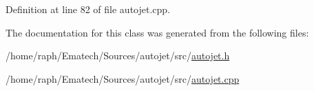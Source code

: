 Definition at line 82 of file autojet.cpp.

The documentation for this class was generated from the following files:\begin{CompactItemize}
\item 
/home/raph/Ematech/Sources/autojet/src/\hyperlink{autojet_8h}{autojet.h}\item 
/home/raph/Ematech/Sources/autojet/src/\hyperlink{autojet_8cpp}{autojet.cpp}\end{CompactItemize}
